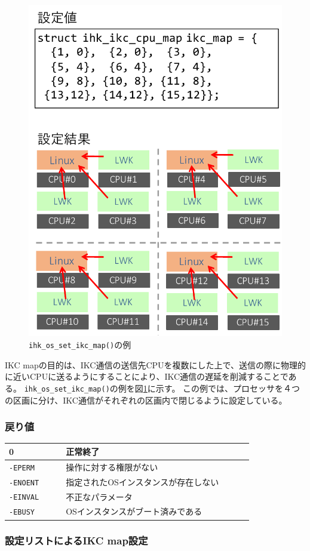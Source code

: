 \documentclass[twoside,11pt,fleqn]{book}
\begin{document}
\begin{figure}[!htb]
\centering
\includegraphics[width=0.5\linewidth]{figs/ikc_map.pdf}
\vspace{-0em}\caption{\texttt{ihk\_os\_set\_ikc\_map()}の例}
\label{fig:ikc_map}
\vspace{-0em}
\end{figure}
\FloatBarrier
%
IKC mapの目的は、IKC通信の送信先CPUを複数にした上で、送信の際に物理的に近いCPUに送るようにすることにより、IKC通信の遅延を削減することである。
\texttt{ihk\_os\_set\_ikc\_map()}の例を図\ref{fig:ikc_map}に示す。
この例では、プロセッサを４つの区画に分け、IKC通信がそれぞれの区画内で閉じるように設定している。

\subsubsection*{戻り値}
\begin{table}[!h]
\footnotesize
\begin{tabular}{|p{0.20\linewidth}|p{0.66\linewidth}|} \hline
0&正常終了\\ \hline
\texttt{-EPERM}&操作に対する権限がない\\ \hline
\texttt{-ENOENT}&指定されたOSインスタンスが存在しない\\ \hline
\texttt{-EINVAL}&不正なパラメータ\\ \hline
\texttt{-EBUSY}&OSインスタンスがブート済みである\\ \hline
\end{tabular}
\vspace{-0em}
\end{table}
\FloatBarrier

\subsubsection{設定リストによるIKC map設定}
\end{document}
